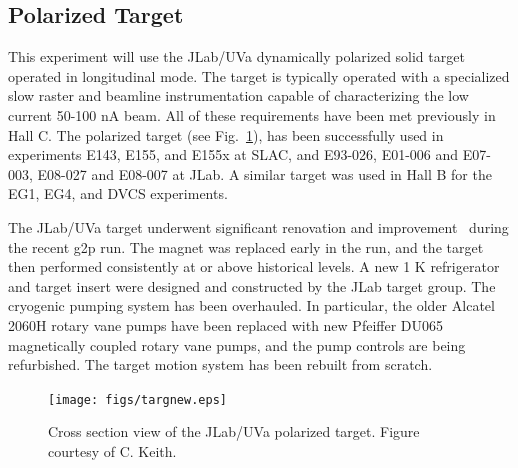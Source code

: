 \subsection{Polarized Target}
\label{POLTARGSEC}
This experiment will use the
JLab/UVa dynamically polarized solid {\TARGET}target operated in longitudinal mode.  
The target is typically operated with a specialized slow raster and beamline instrumentation capable of characterizing the low current 50-100 nA beam.
All of these requirements have been met previously in Hall C.
%
The polarized target (see Fig.~\ref{fig:target}), 
has been successfully used in experiments E143, E155, and E155x at SLAC, and E93-026, E01-006 and E07-003, E08-027 and E08-007 at JLab.
A similar target was used in Hall B for the EG1, EG4, and DVCS experiments. 

The JLab/UVa target underwent significant renovation and improvement~\cite{CKEITH} during the recent g2p run. The magnet was replaced early in the run, and the target then performed consistently at or above historical levels.   A new 1 K refrigerator and target insert were designed and constructed by the JLab target group.  The cryogenic pumping system has been overhauled.  In particular, the older Alcatel 2060H rotary vane pumps have been replaced with new Pfeiffer DU065 magnetically coupled rotary vane pumps, and the pump controls are being refurbished. The target motion system has been rebuilt from scratch. %

%
\begin{figure}
\centering
\texttt{[image: figs/targnew.eps]} %
\caption{Cross section view of the JLab/UVa polarized target. Figure courtesy of C. Keith.  \label{fig:target}}
\end{figure}



